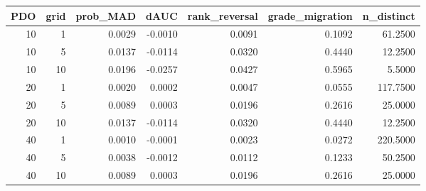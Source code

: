 \begin{tabular}{rrrrrrr}
\toprule
PDO & grid & prob_MAD & dAUC & rank_reversal & grade_migration & n_distinct \\
\midrule
10 & 1 & 0.0029 & -0.0010 & 0.0091 & 0.1092 & 61.2500 \\
10 & 5 & 0.0137 & -0.0114 & 0.0320 & 0.4440 & 12.2500 \\
10 & 10 & 0.0196 & -0.0257 & 0.0427 & 0.5965 & 5.5000 \\
20 & 1 & 0.0020 & 0.0002 & 0.0047 & 0.0555 & 117.7500 \\
20 & 5 & 0.0089 & 0.0003 & 0.0196 & 0.2616 & 25.0000 \\
20 & 10 & 0.0137 & -0.0114 & 0.0320 & 0.4440 & 12.2500 \\
40 & 1 & 0.0010 & -0.0001 & 0.0023 & 0.0272 & 220.5000 \\
40 & 5 & 0.0038 & -0.0012 & 0.0112 & 0.1233 & 50.2500 \\
40 & 10 & 0.0089 & 0.0003 & 0.0196 & 0.2616 & 25.0000 \\
\bottomrule
\end{tabular}
